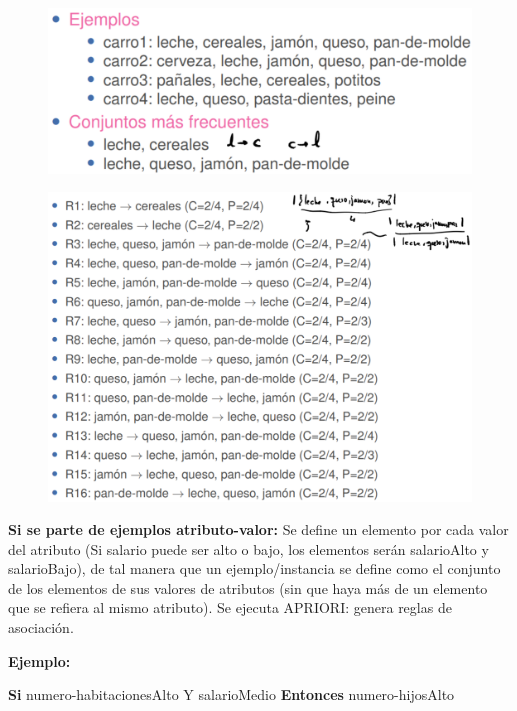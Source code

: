 \documentclass[12pt, twoside, openright]{report} %
\begin{document}
\begin{figure}[H]
  {\includegraphics[scale=.3]{2021-04-10 01_17_45-ensembles-reglasAsociacion.pdf - Foxit Reader.png}}
\end{figure}

\begin{figure}[H]
  {\includegraphics[scale=.3]{2021-04-10 01_18_02-ensembles-reglasAsociacion.pdf - Foxit Reader.png}}
\end{figure}

\textbf{Si se parte de ejemplos atributo-valor:} Se define un elemento por cada valor del atributo (Si salario puede ser alto o bajo, los elementos serán salarioAlto y salarioBajo), de tal manera que un ejemplo/instancia se define como el conjunto de los elementos de sus valores de atributos (sin que haya más de un elemento que se refiera al mismo atributo). Se ejecuta APRIORI: genera reglas de asociación.

\textbf{Ejemplo:}

\textbf{Si} numero-habitacionesAlto Y salarioMedio \textbf{Entonces} numero-hijosAlto
\end{document}
